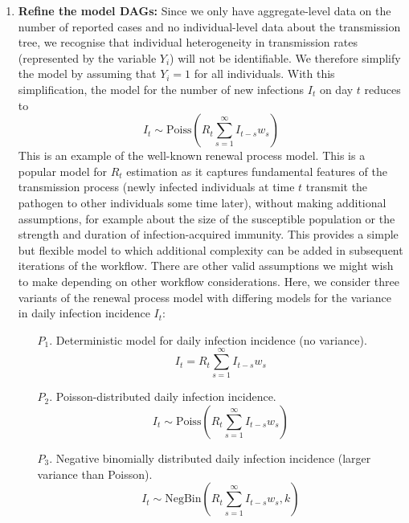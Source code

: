 \documentclass{article}
\begin{document}
\begin{enumerate}
\item \textbf{Refine the model DAGs:} Since we only have aggregate-level data on the number of reported cases and no individual-level data about the transmission tree, we recognise that individual heterogeneity in transmission rates (represented by the variable $Y_i$) will not be identifiable. We therefore simplify the model by assuming that $Y_i=1$ for all individuals. With this simplification, the model for the number of new infections $I_t$ on day $t$ reduces to
    \begin{equation} 
        I_t \sim \mathrm{Poiss}\left( R_t \sum_{s=1}^\infty I_{t-s}w_s  \right)
    \end{equation}
    This is an example of the well-known renewal process model. This is a popular model for $R_t$ estimation as it captures fundamental features of the transmission process (newly infected individuals at time $t$ transmit the pathogen to other individuals some time later), without making additional assumptions, for example about the size of the susceptible population or the strength and duration of infection-acquired immunity. This provides a simple but flexible model to which additional complexity can be added in subsequent iterations of the workflow.
    There are other valid assumptions we might wish to make depending on other workflow considerations. Here, we consider three variants of the renewal process model with differing models for the variance in daily infection incidence $I_t$:
    \begin{itemize}
    \item[$P_1$.] Deterministic model for daily infection incidence (no variance).
    \begin{equation} \label{eq:infections_P1}
        I_t = R_t \sum_{s=1}^\infty I_{t-s}w_s 
    \end{equation}
    \item[$P_2$.] Poisson-distributed daily infection incidence.
        \begin{equation} \label{eq:infections_P2}
        I_t \sim \mathrm{Poiss}\left( R_t \sum_{s=1}^\infty I_{t-s}w_s  \right)
    \end{equation}
    \item[$P_3$.] Negative binomially distributed daily infection incidence (larger variance than Poisson). 
            \begin{equation} \label{eq:infections_P3}
        I_t \sim \mathrm{NegBin}\left( R_t \sum_{s=1}^\infty I_{t-s}w_s, k  \right)
    \end{equation}

\end{itemize}
\end{enumerate}
\end{document}
